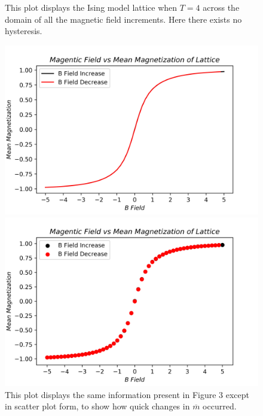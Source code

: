 \documentclass[twocolumn]{article}
\begin{document}
\begin{figure}[H]
\caption{This plot displays the Ising model lattice when $T=4$ across the domain of all the magnetic field increments. Here there exists no hysteresis.}
\centering
\includegraphics[scale=.5]{FirstOrderPhaseT=4Plot}
\caption{This plot displays the same information present in Figure 3 except in scatter plot form, to show how quick changes in $\overline{m}$ occurred.}
\centering
\includegraphics[scale=.5]{FirstOrderPhaseT=4Scatter}
\end{figure} 
\end{document}

